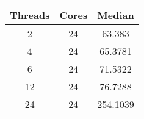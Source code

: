\begin{tabular}{ccc}
\hline
Threads& Cores& Median\\
\hline
2& 24& 63.383\\
4& 24& 65.3781\\
6& 24& 71.5322\\
12& 24& 76.7288\\
24& 24& 254.1039\\
\hline
\end{tabular}
